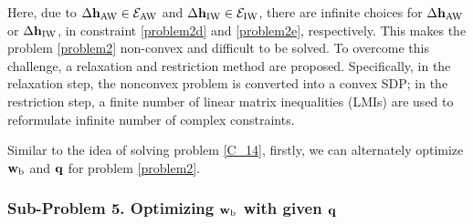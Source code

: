 \documentclass[10pt,journal,letterpaper,twocolumn,twoside]{IEEEtran} %
\begin{document}
Here, due to $\Delta {{\bf{h}}_{\rm{AW}}} \in {{\cal{E}}_{\rm{AW}}}$ and $\Delta {{\bf{h}}_{\rm{IW}}} \in {{\cal{E}}_{\rm{IW}}}$, there are infinite choices for
$\Delta {{\bf{h}}_{\rm{AW}}}$ or $\Delta {{\bf{h}}_{\rm{IW}}}$, in constraint \eqref{problem2d} and \eqref{problem2e}, respectively. This makes the problem \eqref{problem2} non-convex and difficult to be solved.
To overcome this challenge, a relaxation and restriction method are proposed. Specifically,
in the relaxation step, the nonconvex
problem is converted into a convex
SDP;  in
the restriction step, a finite number of linear matrix
inequalities (LMIs) are used to reformulate infinite number of complex
constraints.

Similar to the idea of solving  problem \eqref{C_14},  firstly, we can alternately optimize ${{\mathbf{w}}_{\rm{b}}}$ and ${\bf{q}}$ for problem \eqref{problem2}.

\subsubsection{{{Sub-Problem 5. Optimizing ${{\mathbf{w}}_{\rm{b}}}$ with given ${\bf{q}}$}}}
\end{document}
